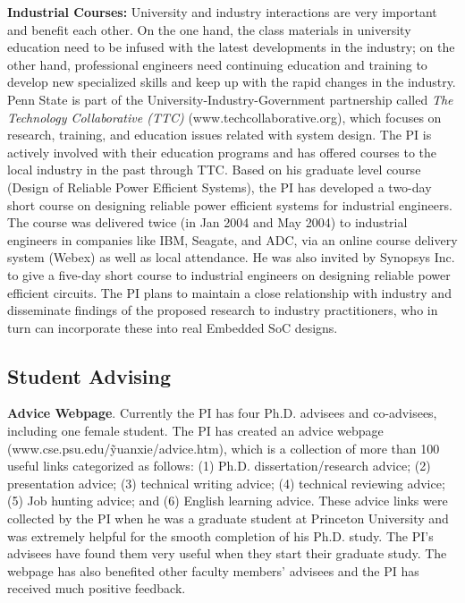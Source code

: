 {\bf Industrial Courses:} University and industry
     interactions are very important and benefit each other.
     On the one hand, the class materials in university education
     need to be infused with the latest developments in the industry;
     on the other hand, professional engineers need continuing
     education and training to develop new specialized skills and
     keep up with the rapid changes in the industry. Penn State is
     part of the University-Industry-Government partnership called
     {\it The Technology Collaborative (TTC)} (www.techcollaborative.org),
     which focuses on research,
     training, and education issues related with system design.
     The PI is actively involved with their education programs
     and has offered courses to the local industry in the past
     through TTC. Based on his graduate level course (Design of
     Reliable Power Efficient Systems), the PI has developed a
     two-day short course on designing reliable power efficient
     systems for industrial engineers. The course was delivered
     twice (in Jan 2004 and May 2004) to industrial engineers
     in companies like IBM, Seagate, and ADC, via an online
     course delivery system (Webex) as well
     as local attendance.  He was also invited by Synopsys Inc.
      to give a five-day short course to industrial engineers
      on designing reliable power efficient circuits.
      The PI plans to maintain a close relationship with
      industry and disseminate findings of the proposed
       research to industry practitioners, who in turn can
       incorporate these into real Embedded SoC designs.

\vspace{10pt}
\subsection{Student Advising}


\squishlist

\item{\bf Advice Webpage}. Currently the PI has four Ph.D.
advisees and co-advisees, including one female student. The PI has
created an advice webpage (www.cse.psu.edu/\~yuanxie/advice.htm),
which is a collection of more than 100 useful links categorized as
follows: (1) Ph.D. dissertation/research advice; (2) presentation
advice; (3) technical writing advice; (4) technical reviewing
advice; (5) Job hunting advice; and (6) English learning advice.
These advice links were collected by the PI when he was a graduate
student at Princeton University and was extremely helpful for the
smooth completion of his Ph.D. study. The PI's advisees have found
them very useful when they start their graduate study. The webpage
has also benefited other faculty members' advisees and the PI has
received much positive feedback.

